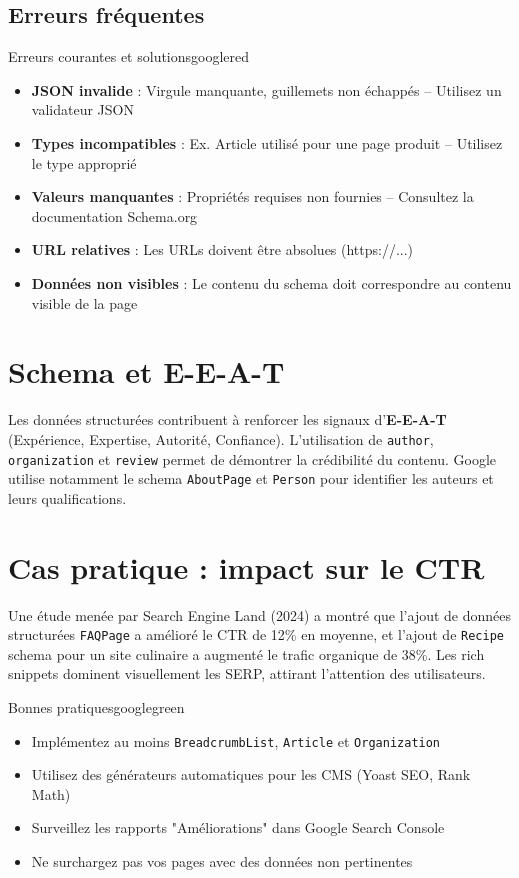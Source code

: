 \documentclass[12pt,a4paper,twoside]{report}
\newcommand{\keyword}[1]{\textbf{\textcolor{googleblue}{#1}}}
\begin{document}
\subsection{Erreurs fréquentes}

\begin{mybox}{Erreurs courantes et solutions}{googlered}
\begin{itemize}
    \item \textbf{JSON invalide} : Virgule manquante, guillemets non échappés -- Utilisez un validateur JSON
    \item \textbf{Types incompatibles} : Ex. Article utilisé pour une page produit -- Utilisez le type approprié
    \item \textbf{Valeurs manquantes} : Propriétés requises non fournies -- Consultez la documentation Schema.org
    \item \textbf{URL relatives} : Les URLs doivent être absolues (https://...)
    \item \textbf{Données non visibles} : Le contenu du schema doit correspondre au contenu visible de la page
\end{itemize}
\end{mybox}

\section{Schema et E-E-A-T}

Les données structurées contribuent à renforcer les signaux d'\keyword{E-E-A-T} (Expérience, Expertise, Autorité, Confiance). L'utilisation de \texttt{author}, \texttt{organization} et \texttt{review} permet de démontrer la crédibilité du contenu. Google utilise notamment le schema \texttt{AboutPage} et \texttt{Person} pour identifier les auteurs et leurs qualifications.

\section{Cas pratique : impact sur le CTR}

Une étude menée par Search Engine Land (2024) a montré que l'ajout de données structurées \texttt{FAQPage} a amélioré le CTR de 12\% en moyenne, et l'ajout de \texttt{Recipe} schema pour un site culinaire a augmenté le trafic organique de 38\%. Les rich snippets dominent visuellement les SERP, attirant l'attention des utilisateurs.

\begin{mybox}{Bonnes pratiques}{googlegreen}
\begin{itemize}
    \item Implémentez au moins \texttt{BreadcrumbList}, \texttt{Article} et \texttt{Organization}
    \item Utilisez des générateurs automatiques pour les CMS (Yoast SEO, Rank Math)
    \item Surveillez les rapports "Améliorations" dans Google Search Console
    \item Ne surchargez pas vos pages avec des données non pertinentes
\end{itemize}
\end{mybox}
\end{document}
